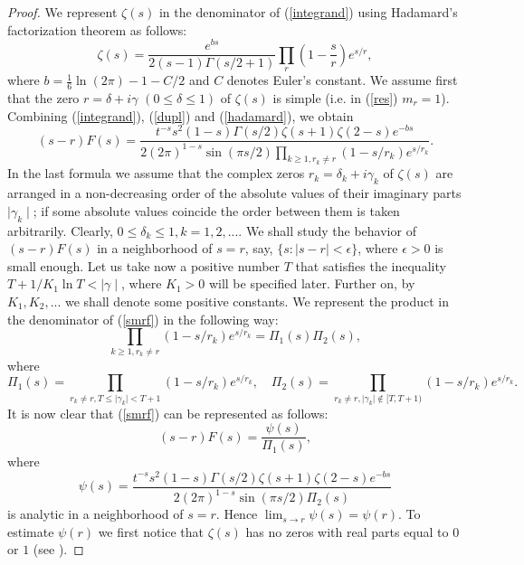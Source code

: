 \documentclass{article}
\begin{document}
\begin{proof}
   We represent $\zeta(s)$ in the denominator of (\ref{integrand})
 using Hadamard's factorization theorem \cite[p.~30-31]{Titchmarsh86} as
 follows:
 \begin{equation}\label{hadamard}
 \zeta(s)
 =\frac{e^{bs}}{2(s-1)\Gamma(s/2+1)}\prod_r\left(1-\frac{s}{r}\right)
 e^{s/r},
 \end{equation}
 where $b=\frac{1}{6}\ln{(2\pi)}-1-C/2$ and $C$ denotes Euler's constant. We
 assume first that the zero $r=\delta+i\gamma$ $(0\le\delta\le 1)$ of $\zeta(s)$ is simple
 (i.e. in (\ref{res}) $m_r=1$). Combining
 (\ref{integrand}), (\ref{dupl}) and (\ref{hadamard}), we obtain
 \begin{equation}\label{smrf}
 (s-r)F(s)
 =\frac{t^{-s}s^2(1-s)\Gamma(s/2)\zeta(s+1)\zeta(2-s)e^{-bs}}
 {2(2\pi)^{1-s}\sin{(\pi s/2)}\prod_{k\ge 1, r_k\neq r} (1-s/r_k)
 e^{s/r_k}}.
 \end{equation}
 In the last formula we assume that the complex zeros $r_k=\delta_k+i\gamma_k$ of
 $\zeta(s)$ are arranged in a non-decreasing order of the absolute
 values of their imaginary parts $\mid\gamma_k\mid$; if
 some absolute values coincide the order between them is taken
 arbitrarily. Clearly, $0\le\delta_k\le 1, k=1,2,...$. We shall
 study the behavior of $(s-r)F(s)$ in a neighborhood of $s=r$,
 say, $\{s:\mid s-r\mid<\epsilon\}$, where $\epsilon>0$ is small
 enough. Let us take now a positive number $T$ that satisfies the
 inequality $T+1/K_1\ln{T}<\mid\gamma\mid$, where $K_1>0$ will be
 specified later. Further on, by $K_1, K_2,...$ we shall denote
 some positive constants. We represent the product in the
 denominator of (\ref{smrf}) in the following way:
 $$
 \prod_{k\ge 1, r_k\neq r}(1-s/r_k)e^{s/r_k} =\Pi_1(s)\Pi_2(s),
 $$
 where
 $$
 \Pi_1(s)=\prod_{r_k\neq r,
 T\le\mid\gamma_k\mid<T+1}(1-s/r_k)e^{s/r_k}, \quad \Pi_2(s) =\prod_{r_k\neq r,
\mid\gamma_k\mid\notin[T,T+1)}(1-s/r_k)e^{s/r_k}.
$$
It is now clear that (\ref{smrf}) can be represented as follows:
\begin{equation}\label{pipsi}
(s-r)F(s)=\frac{\psi(s)}{\Pi_1(s)},
 \end{equation}
 where
\begin{equation}\label{psi}
 \psi(s)
=\frac{t^{-s}s^2(1-s)\Gamma(s/2)\zeta(s+1)\zeta(2-s)e^{-bs}}
 {2(2\pi)^{1-s}\sin{(\pi s/2)}\Pi_2(s)}
\end{equation}
is analytic in a neighborhood of $s=r$. Hence $\lim_{s\to
r}\psi(s)=\psi(r)$. To estimate $\psi(r)$ we first notice that
$\zeta(s)$ has no zeros with real parts equal to $0$ or $1$ (see
\cite[p.~49]{Titchmarsh86}). 

\end{proof}
\end{document}
